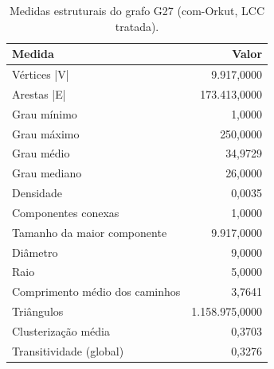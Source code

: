 \begin{table}[ht]
\centering
\caption{Medidas estruturais do grafo G27 (com-Orkut, LCC tratada).}
\label{tab:parte1}
\small
\begin{tabular}{lr}
\hline
Medida & Valor \\
\hline
Vértices |V| & 9.917,0000 \\
Arestas |E| & 173.413,0000 \\
Grau mínimo & 1,0000 \\
Grau máximo & 250,0000 \\
Grau médio & 34,9729 \\
Grau mediano & 26,0000 \\
Densidade & 0,0035 \\
Componentes conexas & 1,0000 \\
Tamanho da maior componente & 9.917,0000 \\
Diâmetro & 9,0000 \\
Raio & 5,0000 \\
Comprimento médio dos caminhos & 3,7641 \\
Triângulos & 1.158.975,0000 \\
Clusterização média & 0,3703 \\
Transitividade (global) & 0,3276 \\
\hline
\end{tabular}
\end{table}
